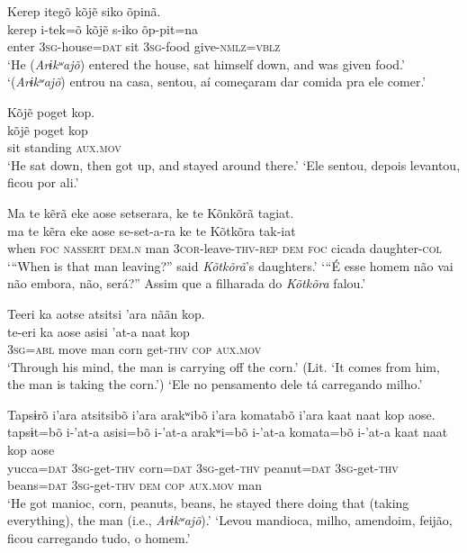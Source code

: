 \documentclass[output=paper,
modfonts,nonflat
]{langsci/langscibook}
\begin{document}
\ea Kerep itegõ{\footnotemark} kõjẽ siko õpinã.\\[.3em]
\gll kerep i-tek=õ kõjẽ s-iko õp-pit=na\\
     enter \textsc{3sg}-house=\textsc{dat} sit \textsc{3sg}-food give-\textsc{nmlz}=\textsc{vblz}\\
\glt ‘He (\textit{Arɨkʷajõ}) entered the house, sat himself down, and was given food.’
\glt ‘(\textit{Arɨkʷajõ}) entrou na casa, sentou, aí começaram dar comida pra ele comer.'
\z 

\ea Kõjẽ poget kop.\\[.3em]
\gll kõjẽ poget kop\\
     sit standing \textsc{aux.mov}\\
\glt ‘He sat down, then got up, and stayed around there.’
\glt ‘Ele sentou, depois levantou, ficou por ali.'
\z 

\ea Ma te kẽrã eke aose setserara, ke te Kõnkõrã tagiat.\\[.3em]
\gll ma te kẽra eke aose se-set-a-ra ke te Kõtkõra tak-iat\\
     when \textsc{foc} \textsc{nassert} \textsc{dem.n} man \textsc{3cor}-leave-\textsc{thv-rep} \textsc{dem} \textsc{foc} cicada daughter-\textsc{col}\\
\glt ‘“When is that man leaving?” said \textit{Kõtkõrã}'s daughters.’
\glt ‘“É esse homem não vai não embora, não, será?” Assim que a filharada do \textit{Kõtkõra} falou.' 
\z 

\ea Teeri ka aotse atsitsi 'ara nããn kop.\\[.3em]
\gll te-eri ka aose asisi 'at-a naat kop\\
     \textsc{3sg}=\textsc{abl} move man corn get-\textsc{thv} \textsc{cop} \textsc{aux.mov}\\
\glt ‘Through his mind, the man is carrying off the corn.’ (Lit. ‘It comes from him, the man is taking the corn.’)
\glt ‘Ele no pensamento dele tá carregando milho.'
\z 

\newpage 
\ea Tapsɨrõ i'ara atsitsibõ i'ara arakʷibõ i'ara komatabõ i'ara kaat naat kop aose.\\[.3em]
\gll tapsɨt=bõ i-'at-a asisi=bõ i-'at-a arakʷi=bõ i-'at-a komata=bõ i-'at-a kaat naat kop aose\\
     yucca=\textsc{dat} \textsc{3sg}-get-\textsc{thv} corn=\textsc{dat} \textsc{3sg}-get-\textsc{thv} peanut=\textsc{dat} \textsc{3sg}-get-\textsc{thv} beans=\textsc{dat} \textsc{3sg}-get-\textsc{thv} \textsc{dem} \textsc{cop} \textsc{aux.mov} man\\
\glt  ‘He got manioc, corn, peanuts, beans, he stayed there doing that (taking everything), the man (i.e., \textit{Arɨkʷajõ}).’
\glt ‘Levou mandioca, milho, amendoim, feijão, ficou carregando tudo, o homem.'
\z  
\end{document}
